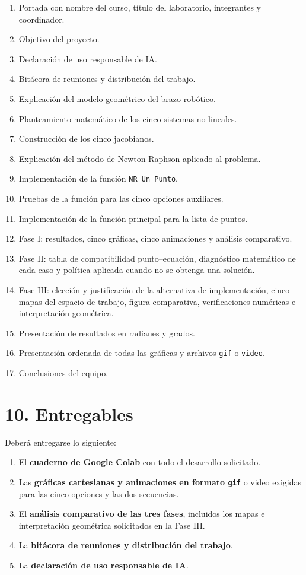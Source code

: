 \documentclass[12pt]{article}
\begin{document}
\begin{enumerate}[label=\arabic*.]
    \item Portada con nombre del curso, título del laboratorio, integrantes y coordinador.
    \item Objetivo del proyecto.
    \item Declaración de uso responsable de IA.
    \item Bitácora de reuniones y distribución del trabajo.
    \item Explicación del modelo geométrico del brazo robótico.
    \item Planteamiento matemático de los cinco sistemas no lineales.
    \item Construcción de los cinco jacobianos.
    \item Explicación del método de Newton-Raphson aplicado al problema.
    \item Implementación de la función \texttt{NR\_Un\_Punto}.
    \item Pruebas de la función para las cinco opciones auxiliares.
    \item Implementación de la función principal para la lista de puntos.
    \item Fase I: resultados, cinco gráficas, cinco animaciones y análisis comparativo.
    \item Fase II: tabla de compatibilidad punto--ecuación, diagnóstico matemático de cada caso y política aplicada cuando no se obtenga una solución.
    \item Fase III: elección y justificación de la alternativa de implementación, cinco mapas del espacio de trabajo, figura comparativa, verificaciones numéricas e interpretación geométrica.
    \item Presentación de resultados en radianes y grados.
    \item Presentación ordenada de todas las gráficas y archivos \texttt{gif} o \texttt{video}.
    \item Conclusiones del equipo.
\end{enumerate}

\section*{10. Entregables}

Deberá entregarse lo siguiente:

\begin{enumerate}[label=\arabic*.]
    \item El \textbf{cuaderno de Google Colab} con todo el desarrollo solicitado.
    \item Las \textbf{gráficas cartesianas y animaciones en formato \texttt{gif}} o video exigidas para las cinco opciones y las dos secuencias.
    \item El \textbf{análisis comparativo de las tres fases}, incluidos los mapas e interpretación geométrica solicitados en la Fase III.
    \item La \textbf{bitácora de reuniones y distribución del trabajo}.
    \item La \textbf{declaración de uso responsable de IA}.
\end{enumerate}
\end{document}
